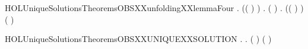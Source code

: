 \begin{SaveVerbatim}{HOLUniqueSolutionsTheoremsOBSXXunfoldingXXlemmaFour}
\HOLTokenTurnstile{} \HOLSymConst{\HOLTokenForall{}}     .
         \HOLSymConst{\HOLTokenConj{}}   \HOLSymConst{\HOLTokenConj{}}  (( \HOLConst{\HOLTokenCompose}   ) )   \HOLSymConst{\HOLTokenConj{}}
         \HOLSymConst{\HOLTokenLeq{}}  \HOLSymConst{\HOLTokenImp{}}
       \HOLSymConst{\HOLTokenExists{}}.
             \HOLSymConst{\HOLTokenConj{}} ( \HOLSymConst{=}  ) \HOLSymConst{\HOLTokenConj{}}
           \HOLSymConst{\HOLTokenForall{}}.  (( \HOLConst{\HOLTokenCompose}   ) )  ( )
\end{SaveVerbatim}
\newcommand{\HOLUniqueSolutionsTheoremsOBSXXunfoldingXXlemmaFour}{\UseVerbatim{HOLUniqueSolutionsTheoremsOBSXXunfoldingXXlemmaFour}}
\begin{SaveVerbatim}{HOLUniqueSolutionsTheoremsOBSXXUNIQUEXXSOLUTION}
\HOLTokenTurnstile{} \HOLSymConst{\HOLTokenForall{}}.
         \HOLSymConst{\HOLTokenConj{}}   \HOLSymConst{\HOLTokenImp{}}
       \HOLSymConst{\HOLTokenForall{}} .
             ( ) \HOLSymConst{\HOLTokenConj{}}   ( ) \HOLSymConst{\HOLTokenImp{}}   
\end{SaveVerbatim}
\newcommand{\HOLUniqueSolutionsTheoremsOBSXXUNIQUEXXSOLUTION}{\UseVerbatim{HOLUniqueSolutionsTheoremsOBSXXUNIQUEXXSOLUTION}}

